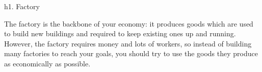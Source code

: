 h1. Factory

The factory is the backbone of your economy: it produces goods which are used to build new buildings and required to keep existing ones up and running. However, the factory requires money and lots of workers, so instead of building many factories to reach your goals, you should try to use the goods they produce as economically as possible.